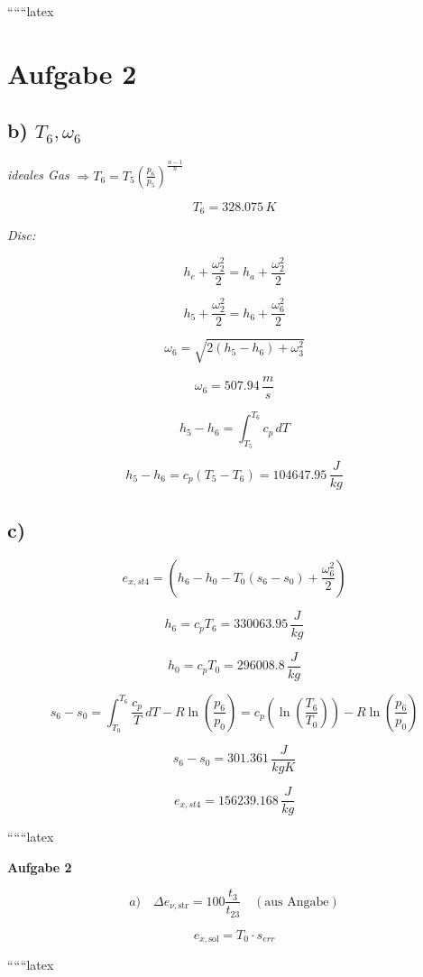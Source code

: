 ``````latex


\section*{Aufgabe 2}
\subsection*{b) $T_6, \omega_6$}

\textit{ideales Gas} $\Rightarrow T_6 = T_5 \left( \frac{p_6}{p_5} \right)^{\frac{n-1}{n}}$

\[ T_6 = 328.075 \, K \]

\textit{Disc:}

\[ h_e + \frac{\omega_2^2}{2} = h_a + \frac{\omega_2^2}{2} \]

\[ h_5 + \frac{\omega_2^2}{2} = h_6 + \frac{\omega_6^2}{2} \]

\[ \omega_6 = \sqrt{2(h_5 - h_6) + \omega_3^2} \]

\[ \omega_6 = 507.94 \, \frac{m}{s} \]

\[ h_5 - h_6 = \int_{T_5}^{T_6} c_p \, dT \]

\[ h_5 - h_6 = c_p (T_5 - T_6) = 104647.95 \, \frac{J}{kg} \]

\subsection*{c)}

\[ e_{x,st4} = (h_6 - h_0 - T_0 (s_6 - s_0) + \frac{\omega_6^2}{2}) \]

\[ h_6 = c_p T_6 = 330063.95 \, \frac{J}{kg} \]

\[ h_0 = c_p T_0 = 296008.8 \, \frac{J}{kg} \]

\[ s_6 - s_0 = \int_{T_0}^{T_6} \frac{c_p}{T} \, dT - R \ln \left( \frac{p_6}{p_0} \right) = c_p \left( \ln \left( \frac{T_6}{T_0} \right) \right) - R \ln \left( \frac{p_6}{p_0} \right) \]

\[ s_6 - s_0 = 301.361 \, \frac{J}{kgK} \]

\[ e_{x,st4} = 156239.168 \, \frac{J}{kg} \]

``````latex


\textbf{Aufgabe 2}

\[
a) \quad \Delta e_{\nu, \text{str}} = 100 \frac{t_3}{t_{23}} \quad (\text{aus Angabe})
\]

\[
e_{x, \text{sol}} = T_0 \cdot s_{err}
\]

``````latex


